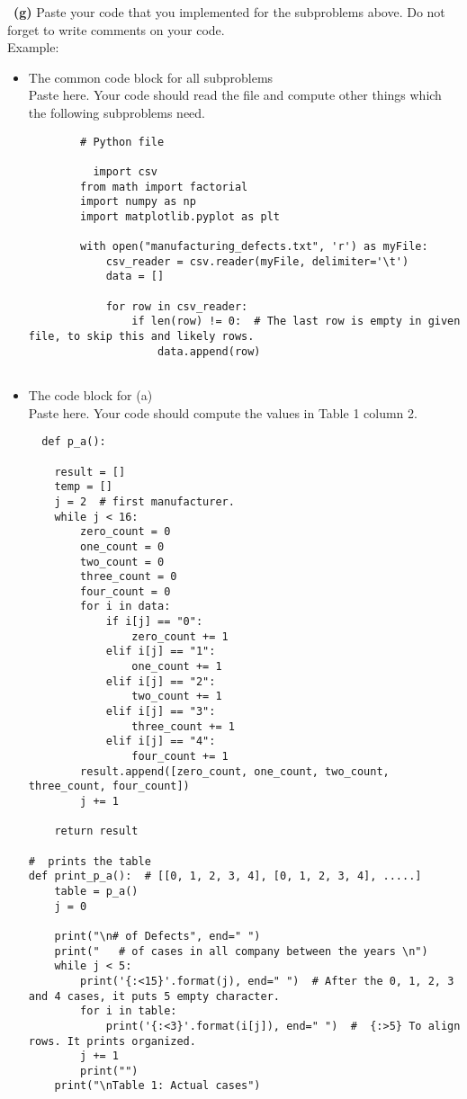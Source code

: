 \documentclass[a4 paper]{article}
\numberwithin{equation}{section}
\newcommand{\subproblem}[1]{~\newline\textbf{(#1)}}
\newcommand{\0}{\mathbf{0}}
\begin{document}
	\subproblem{g} Paste your code that you implemented for the subproblems above. Do not forget to write comments on your code.\\
	Example:\\
	\begin{itemize}
		\item The common code block for all subproblems\\
		Paste here. Your code should read the file and compute other things which the following subproblems need.\\
		\begin{lstlisting}
		# Python file

		  import csv
        from math import factorial
        import numpy as np
        import matplotlib.pyplot as plt

        with open("manufacturing_defects.txt", 'r') as myFile:
            csv_reader = csv.reader(myFile, delimiter='\t')
            data = []

            for row in csv_reader:
                if len(row) != 0:  # The last row is empty in given file, to skip this and likely rows.
                    data.append(row)
                
		\end{lstlisting}
		\newpage
        
		\item
		The code block for (a)\\
		Paste here. Your code should compute the values in Table 1 column 2.
		\begin{lstlisting}
  def p_a():

    result = []
    temp = []
    j = 2  # first manufacturer.
    while j < 16:
        zero_count = 0
        one_count = 0
        two_count = 0
        three_count = 0
        four_count = 0
        for i in data:
            if i[j] == "0":
                zero_count += 1
            elif i[j] == "1":
                one_count += 1
            elif i[j] == "2":
                two_count += 1
            elif i[j] == "3":
                three_count += 1
            elif i[j] == "4":
                four_count += 1
        result.append([zero_count, one_count, two_count, three_count, four_count])
        j += 1

    return result

#  prints the table
def print_p_a():  # [[0, 1, 2, 3, 4], [0, 1, 2, 3, 4], .....]
    table = p_a()
    j = 0

    print("\n# of Defects", end=" ")
    print("   # of cases in all company between the years \n")
    while j < 5:
        print('{:<15}'.format(j), end=" ")  # After the 0, 1, 2, 3 and 4 cases, it puts 5 empty character.
        for i in table:
            print('{:<3}'.format(i[j]), end=" ")  #  {:>5} To align rows. It prints organized.
        j += 1
        print("")
    print("\nTable 1: Actual cases")
		\end{lstlisting}
		

\end{itemize}
\end{document}
